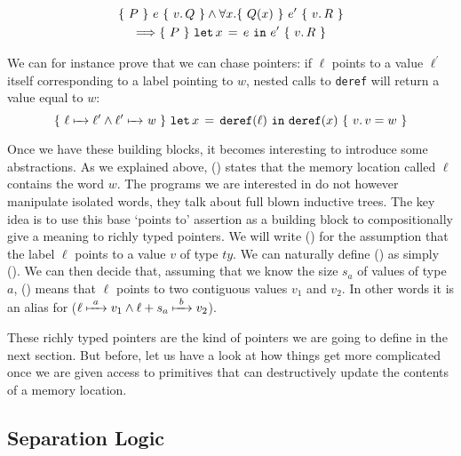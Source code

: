 \begin{gather*}
  \lbrace~ P ~\rbrace~ e ~\lbrace~ v.\, Q ~\rbrace \wedge \forall x. \lbrace~ Q(x) ~\rbrace~ e^{\prime} ~\lbrace~ v.\, R ~\rbrace \\
  \Longrightarrow \lbrace~ P ~\rbrace~ \texttt{let}\,x\,=\,e~\texttt{in}~e^{\prime} ~\lbrace~ v.\, R ~\rbrace
\end{gather*}

We can for instance prove that we can chase pointers:
if $\ell$ points to a value $\ell^{\prime}$ itself corresponding
to a label pointing to $w$, nested calls to \texttt{deref}
will return a value equal to $w$:
\[ \lbrace~ \ell \xmapsto{~~} \mathit{\ell^{\prime}} \wedge \ell^{\prime} \xmapsto{~~} \mathit{w} ~\rbrace~ \texttt{let}\,x\,=\,\texttt{deref}(\ell)~\texttt{in}~\texttt{deref}(x) ~\lbrace~ v.\, v = w ~\rbrace
\]

Once we have these building blocks, it becomes interesting to introduce
some abstractions. As we explained above, () states that
the memory location called $\ell$ contains the word $w$.
%
The programs we are interested in do not however manipulate isolated words,
they talk about full blown inductive trees.
%
The key idea is to use this base `points to' assertion as a building
block to compositionally give a meaning to richly typed pointers.
We will write () for the assumption that
the label $\ell$ points to a value $v$ of type $\mathit{ty}$.
%
We can naturally define () as
simply ().
%
We can then decide that, assuming that we know the size $s_a$
of values of type $a$, ()
means that $\ell$ points to two contiguous values $v_1$ and $v_2$.
%
In other words it is an alias for
($\ell \xmapsto{~a~} v_1 \wedge \ell+s_a \xmapsto{~b~} v_2$).


These richly typed pointers are the kind of pointers we are going to
define in the next section.
%
But before, let us have a look at how things get more complicated
once we are given access to primitives that can destructively update
the contents of a memory location.

\subsection{Separation Logic}

